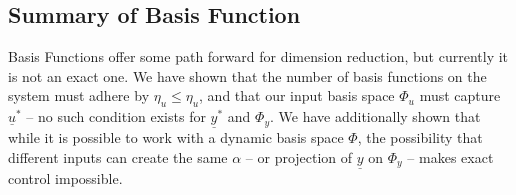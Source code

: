\FloatBarrier\subsection{Summary of Basis Function}
Basis Functions offer some path forward for dimension reduction, but currently it is not an exact one. We have shown that the number of basis functions on the system must adhere by $\eta_u \leq \eta_u$, and that our input basis space $\Phi_u$ must capture $\underline{u}^\ast$ -- no such condition exists for $\underline{y}^\ast$ and $\Phi_y$. We have additionally shown that while it is possible to work with a dynamic basis space $\Phi$, the possibility that different inputs can create the same $\alpha$ -- or projection of $\underline{y}$ on $\Phi_y$ -- makes exact control impossible.